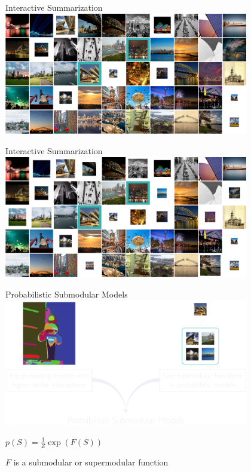 \documentclass[mathserif]{beamer}
\newcommand{\qboxa}[1]{%
\begin{tcolorbox}[enhanced jigsaw,size=tight,hbox,boxsep=4pt,boxrule=1pt,coltext=textcolor,colframe=col1,opacityback=0,opacityframe=1]
\strut #1
\end{tcolorbox}%
}
\begin{document}
\begin{frame}{Interactive Summarization}
\vspace{0.5em}
\centering
\includegraphics[width=4.2in]{figures/flickr_probs_2_1.png}
\end{frame}

\begin{frame}{Interactive Summarization}
\vspace{0.5em}
\centering
\includegraphics[width=4.2in]{figures/flickr_probs_2_2.png}
\end{frame}

\begin{frame}{Probabilistic Submodular Models}
\vspace{0.5em}
\centering
\includegraphics[width=4.2in]{figures/psm.pdf}

\vspace{0.5em}
\qboxa{$p(S) = \displaystyle\frac{1}{Z} \exp(F(S))$} $F$ is a submodular or supermodular function
\end{frame}
\end{document}
